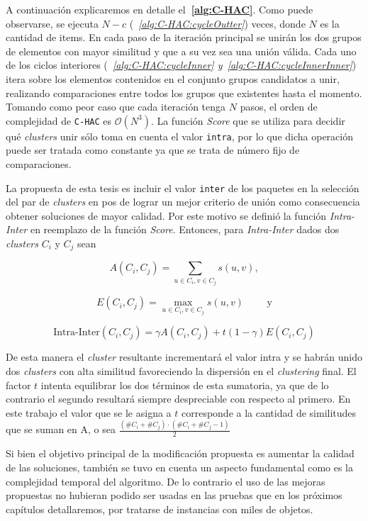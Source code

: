 A continuación explicaremos en detalle el\textbf{~\autoref{alg:C-HAC}}. Como puede observarse, se ejecuta $N - c$ (\textit{~\autoref{alg:C-HAC:cycleOutter}}) veces, donde $N$ es la cantidad de items. En cada paso de la iteración principal se unirán los dos grupos de elementos con mayor similitud y que a su vez sea una unión válida. Cada uno de los ciclos interiores (\textit{~\autoref{alg:C-HAC:cycleInner} y~\autoref{alg:C-HAC:cycleInnerInner}}) itera sobre los elementos contenidos en el conjunto grupos candidatos a unir, realizando comparaciones entre todos los grupos que existentes hasta el momento. Tomando como peor caso que cada iteración tenga $N$ pasos, el orden de complejidad de \texttt{C-HAC} es $\mathcal{O}(N^{3})$. La función \textit{Score} que se utiliza para decidir qué {\em clusters} unir sólo toma en cuenta el valor \texttt{intra}, por lo que dicha operación puede ser tratada como constante ya que se trata de número fijo de comparaciones.

La propuesta de esta tesis es incluir el valor \texttt{inter} de los paquetes en la selección del par de {\em clusters} en pos de lograr un mejor criterio de unión como consecuencia obtener soluciones de mayor calidad. Por este motivo se definió la función \textit{Intra-Inter} en reemplazo de la función \textit{Score}. Entonces, para \textit{Intra-Inter} dados dos {\em clusters} $C_i$ y $C_j$ sean

$$A(C_i,C_j) = \sum_{u \in C_i, v \in C_j}{s(u,v)},$$

$$E(C_i,C_j)=\max_{u \in C_i, v \in C_j}{s(u,v)} \qquad \mbox{ y}$$

$$\mbox{Intra-Inter}(C_i,C_j) = \gamma A(C_i,C_j) + t (1-\gamma) E(C_i,C_j)$$

De esta manera el {\em cluster} resultante incrementará el valor intra y se habrán unido dos {\em clusters} con alta similitud favoreciendo la dispersión en el {\em clustering} final. El factor $t$ intenta equilibrar los dos términos de esta sumatoria, ya que de lo contrario el segundo resultará siempre despreciable con respecto al primero. En este trabajo el valor que se le asigna a $t$ corresponde a la cantidad de similitudes que se suman en A, o sea $\frac{(\#C_i + \#C_j) \cdot (\#C_i + \#C_j - 1)}{2}$  

Si bien el objetivo principal de la modificación propuesta es aumentar la calidad de las soluciones, también se tuvo en cuenta un aspecto fundamental como es la complejidad temporal del algoritmo. De lo contrario el uso de las mejoras propuestas no hubieran podido ser usadas en las pruebas que en los próximos capítulos detallaremos, por tratarse de instancias con miles de objetos.

